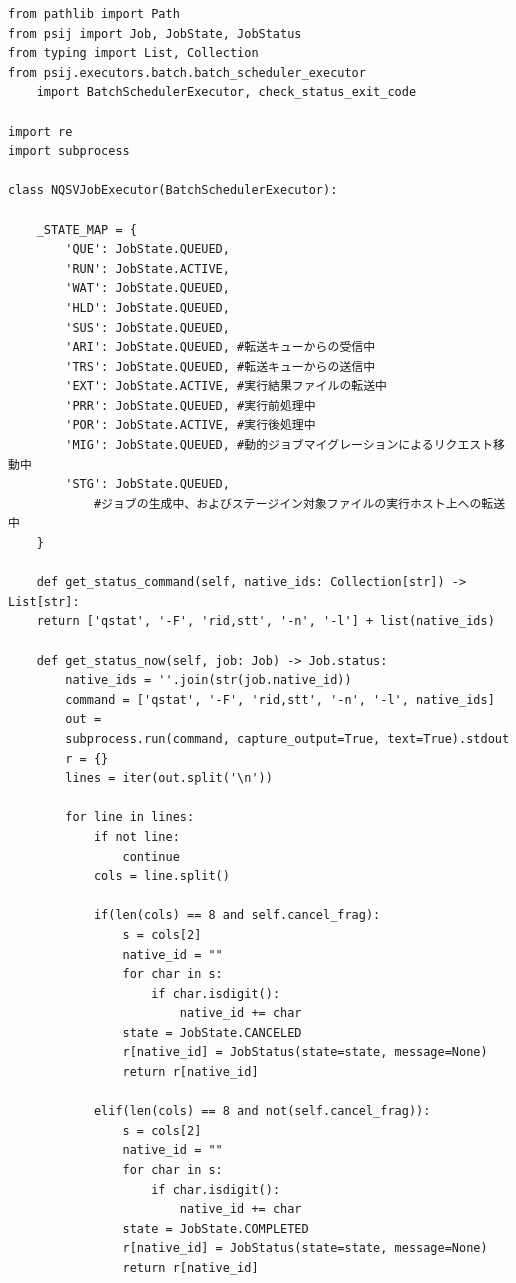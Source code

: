 \begin{lstlisting}[caption=ジョブの状態取得メソッド, label=get_status_now]
from pathlib import Path
from psij import Job, JobState, JobStatus
from typing import List, Collection 
from psij.executors.batch.batch_scheduler_executor 
    import BatchSchedulerExecutor, check_status_exit_code

import re
import subprocess

class NQSVJobExecutor(BatchSchedulerExecutor):

    _STATE_MAP = {
        'QUE': JobState.QUEUED,
        'RUN': JobState.ACTIVE,
        'WAT': JobState.QUEUED,
        'HLD': JobState.QUEUED,
        'SUS': JobState.QUEUED,
        'ARI': JobState.QUEUED, #転送キューからの受信中
        'TRS': JobState.QUEUED, #転送キューからの送信中
        'EXT': JobState.ACTIVE, #実行結果ファイルの転送中
        'PRR': JobState.QUEUED, #実行前処理中
        'POR': JobState.ACTIVE, #実行後処理中
        'MIG': JobState.QUEUED, #動的ジョブマイグレーションによるリクエスト移動中
        'STG': JobState.QUEUED, 
            #ジョブの生成中、およびステージイン対象ファイルの実行ホスト上への転送中
    }

    def get_status_command(self, native_ids: Collection[str]) -> List[str]:
    return ['qstat', '-F', 'rid,stt', '-n', '-l'] + list(native_ids) 

    def get_status_now(self, job: Job) -> Job.status:
        native_ids = ''.join(str(job.native_id))
        command = ['qstat', '-F', 'rid,stt', '-n', '-l', native_ids]
        out = 
        subprocess.run(command, capture_output=True, text=True).stdout
        r = {}
        lines = iter(out.split('\n'))

        for line in lines:
            if not line:
                continue
            cols = line.split()

            if(len(cols) == 8 and self.cancel_frag):
                s = cols[2]
                native_id = ""
                for char in s:
                    if char.isdigit():
                        native_id += char
                state = JobState.CANCELED
                r[native_id] = JobStatus(state=state, message=None)
                return r[native_id]
            
            elif(len(cols) == 8 and not(self.cancel_frag)):
                s = cols[2]
                native_id = ""
                for char in s:
                    if char.isdigit():
                        native_id += char
                state = JobState.COMPLETED
                r[native_id] = JobStatus(state=state, message=None)
                return r[native_id]


\end{lstlisting}
